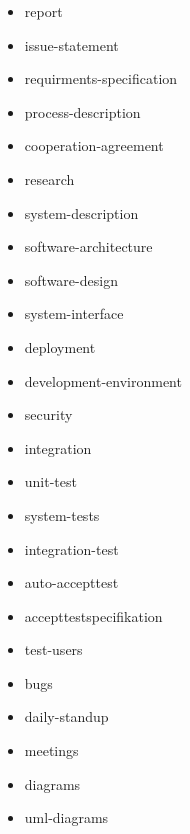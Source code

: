 \begin{itemize}
    \item report
    \item issue-statement
    \item requirments-specification
    \item process-description
    \item cooperation-agreement
    \item research
    \item system-description
    \item software-architecture
    \item software-design
    \item system-interface
    \item deployment
    \item development-environment
    \item security
    \item integration
    \item unit-test
    \item system-tests
    \item integration-test
    \item auto-accepttest
    \item accepttestspecifikation
    \item test-users
    \item bugs
    \item daily-standup
    \item meetings
    \item diagrams
    \item uml-diagrams
\end{itemize}

